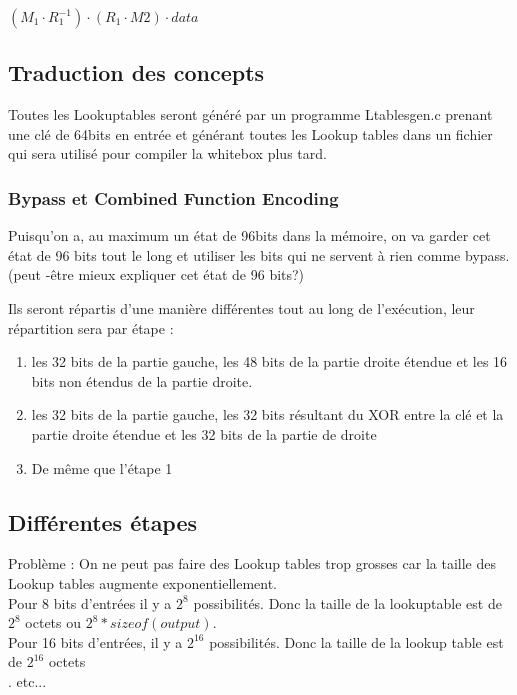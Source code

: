 \documentclass[a4paper,12pt]{article}
\begin{document}
$(M_1 \cdot R_1^{-1}) \cdot (R_1 \cdot M2 ) \cdot data$\\


\newpage

\subsection{Traduction des concepts}

Toutes les Lookuptables seront généré par un programme Ltablesgen.c prenant une clé de 64bits en entrée et générant toutes les Lookup tables dans un fichier qui sera utilisé pour compiler la whitebox plus tard.

\subsubsection{Bypass et Combined Function Encoding}

Puisqu'on a, au maximum un état de 96bits dans la mémoire, on va garder cet état de 96 bits tout le long et utiliser les bits qui ne servent à rien comme bypass.\\

(peut -être mieux expliquer cet état de 96 bits?)

Ils seront répartis d'une manière différentes tout au long de l'exécution, leur répartition sera par étape :
\begin{enumerate}
\item les 32 bits de la partie gauche, les 48 bits de la partie droite étendue et les 16 bits non étendus de la partie droite.
\item les 32 bits de la partie gauche, les 32 bits résultant du XOR entre la clé et la partie droite étendue et les 32 bits de la partie de droite
\item De même que l'étape 1
\end{enumerate}

\subsection{Différentes étapes}


Problème :
On ne peut pas faire des Lookup tables trop grosses car la taille des Lookup tables augmente exponentiellement.\\

Pour 8 bits d'entrées il y a $2^{8}$ possibilités. Donc la taille de la lookuptable est de $2^{8}$ octets ou $2^{8} * sizeof(output)$.\\
Pour 16 bits d'entrées, il y a $2^{16}$ possibilités. Donc la taille de la lookup table est de $2^{16}$ octets\\.
etc...\\
\end{document}
